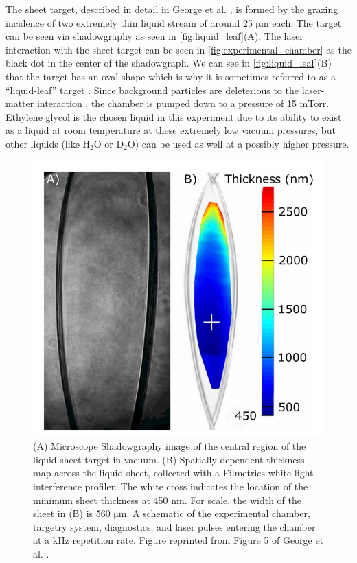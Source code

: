 The sheet target, described in detail in George et al. \cite{George_2019_HPLSE}, is formed by the grazing incidence of two extremely thin liquid stream of around 25 $\unit{\micro \meter}$ each. The target can be seen via shadowgraphy as seen in \autoref{fig:liquid_leaf}(A). The laser interaction with the sheet target can be seen in \autoref{fig:experimental_chamber} as the black dot in the center of the shadowgraph. We can see in \autoref{fig:liquid_leaf}(B) that the target has an oval shape which is why it is sometimes referred to as a ``liquid-leaf'' target \cite{Schmitz_2023_LaPB}. Since background particles are deleterious to the laser-matter interaction \cite{Snyder_2020_SciRep}, the chamber is pumped down to a pressure of 15 mTorr. Ethylene glycol is the chosen liquid in this experiment due to its ability to exist as a liquid at room temperature at these extremely low vacuum pressures, but other liquids (like $\text{H}_2\text{O}$ or $\text{D}_2\text{O}$) can be used as well at a possibly higher pressure.

\begin{figure}
	\centering 
	\includegraphics[width=0.75\linewidth]{planning/images/daq/target.PNG}
	\caption{(A) Microscope Shadowgraphy image of the central region of the liquid sheet target in vacuum. (B) Spatially dependent thickness map across the liquid sheet, collected with a Filmetrics white-light interference profiler. The white cross indicates the location of the minimum sheet thickness at 450 $\unit{\nano \meter}$. For scale, the width of the sheet in (B) is 560 $\unit{\micro \meter}$. A schematic of the experimental chamber, targetry system, diagnostics, and laser pulses entering the chamber at a kHz repetition rate. Figure reprinted from Figure 5 of George et al. \cite{George_2019_HPLSE}.}
	\label{fig:liquid_leaf}
\end{figure}


